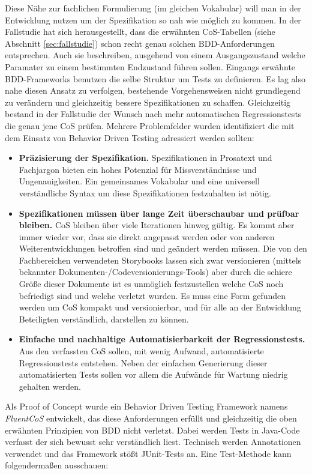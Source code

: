 Diese Nähe zur fachlichen Formulierung (im gleichen Vokabular) will man in der Entwicklung nutzen um der Spezifikation so nah wie möglich zu kommen. In der Fallstudie hat sich herausgestellt, dass die erwähnten CoS-Tabellen (siehe Abschnitt \ref{sec:fallstudie}) schon recht genau solchen BDD-Anforderungen entsprechen. Auch sie beschreiben, ausgehend von einem Ausgangszustand welche Paramater zu einem bestimmten Endzustand führen sollen. Eingangs erwähnte BDD-Frameworks benutzen die selbe Struktur um Tests zu definieren. Es lag also nahe diesen Ansatz zu verfolgen, bestehende Vorgehensweisen nicht grundlegend zu verändern und gleichzeitig bessere Spezifikationen zu schaffen. Gleichzeitig bestand in der Fallstudie der Wunsch nach mehr automatischen Regressionstests die genau jene CoS prüfen. Mehrere Problemfelder wurden identifiziert die mit dem Einsatz von Behavior Driven Testing adressiert werden sollten:


\begin{itemize}
\item \textbf{Präzisierung der Spezifikation.} Spezifikationen in Prosatext und Fachjargon bieten ein hohes Potenzial für Missverständnisse und Ungenauigkeiten. Ein gemeinsames Vokabular und eine universell verständliche Syntax um diese Spezifikationen festzuhalten ist nötig.
\item \textbf{Spezifikationen müssen über lange Zeit überschaubar und prüfbar bleiben.} CoS bleiben über viele Iterationen hinweg gültig. Es kommt aber immer wieder vor, dass sie direkt angepasst werden oder von anderen Weiterentwicklungen betroffen sind und geändert werden müssen. Die von den Fachbereichen verwendeten Storybooks lassen sich zwar versionieren (mittels bekannter Dokumenten-/Codeversionierungs-Tools) aber durch die schiere Größe dieser Dokumente ist es unmöglich festzustellen welche CoS noch befriedigt sind und welche verletzt wurden. Es muss eine Form gefunden werden um CoS kompakt und versionierbar, und für alle an der Entwicklung Beteiligten verständlich, darstellen zu können.
\item \textbf{Einfache und nachhaltige Automatisierbarkeit der Regressionstests.} Aus den verfassten CoS sollen, mit wenig Aufwand, automatisierte Regressionstests entstehen. Neben der einfachen Generierung dieser automatisierten Tests sollen vor allem die Aufwände für Wartung niedrig gehalten werden.
\end{itemize}


Als Proof of Concept wurde ein Behavior Driven Testing Framework namens \textit{FluentCoS} entwickelt, das diese Anforderungen erfüllt und gleichzeitig die oben erwähnten Prinzipien von BDD nicht verletzt. Dabei werden Tests in Java-Code verfasst der sich bewusst sehr verständlich liest. Technisch werden Annotationen verwendet und das Framework stößt JUnit-Tests an. Eine Test-Methode kann folgendermaßen ausschauen:

